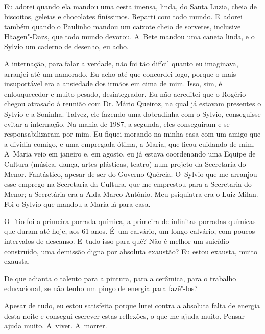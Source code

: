 Eu adorei quando ela mandou uma cesta imensa, linda, do Santa Luzia,
cheia de biscoitos, geleias e chocolates finíssimos. Reparti com todo
mundo. E~adorei também quando o Paulinho mandou um caixote cheio de
sorvetes, inclusive Häagen"-Dazs, que todo mundo devorou. A~Bete mandou
uma caneta linda, e o Sylvio um caderno de desenho, eu acho.

A internação, para falar a verdade, não foi tão difícil quanto eu
imaginava, arranjei até um namorado. Eu acho até que concordei logo,
porque o mais insuportável era a ansiedade dos irmãos em cima de mim.
Isso, sim, é enlouquecedor e muito pesado, desintegrador. Eu não
acreditei que o Rogério chegou atrasado à reunião com Dr. Mário Queiroz,
na qual já estavam presentes o Sylvio e a Soninha. Talvez, ele fazendo
uma dobradinha com o Sylvio, conseguisse evitar a internação. Na mania
de 1987, a segunda, eles conseguiram e se responsabilizaram por mim. Eu
fiquei morando na minha casa com um amigo que a dividia comigo, e uma
empregada ótima, a Maria, que ficou cuidando de mim. A~Maria veio em
janeiro e, em agosto, eu já estava coordenando uma Equipe de Cultura
(música, dança, artes plásticas, teatro) num projeto da Secretaria do
Menor. Fantástico, apesar de ser do Governo Quércia. O~Sylvio que me
arranjou esse emprego na Secretaria da Cultura, que me emprestou para a
Secretaria do Menor; a Secretária era a Alda Marco Antônio. Meu
psiquiatra era o Luiz Milan. Foi o Sylvio que mandou a Maria lá para
casa.

O lítio foi a primeira porrada química, a primeira de infinitas porradas
químicas que duram até hoje, aos 61 anos. É~um calvário, um longo
calvário, com poucos intervalos de descanso. E~tudo isso para quê? Não é
melhor um suicídio construído, uma demissão digna por absoluta exaustão?
Eu estou exausta, muito exausta.

De que adianta o talento para a pintura, para a cerâmica, para o trabalho
educacional, se não tenho um pingo de energia para fazê"-los?

Apesar de tudo, eu estou satisfeita porque lutei contra a absoluta falta
de energia desta noite e consegui escrever estas reflexões, o que me
ajuda muito. Pensar ajuda muito. A~viver. A~morrer.


